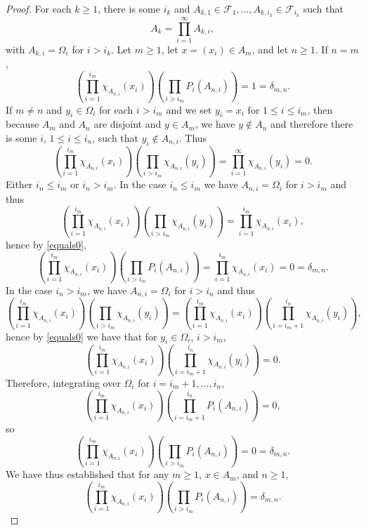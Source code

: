 \documentclass{article}
\theoremstyle{definition}
\begin{document}
\begin{proof}
For each $k \geq 1$, there is some $i_k$ and $A_{k,1} \in \mathscr{F}_1, \ldots,A_{k,i_k} \in \mathscr{F}_{i_k}$ such that
\[
A_k = \prod_{i=1}^\infty A_{k,i},
\]
with $A_{k,i}=\Omega_i$ for $i>i_k$. 
Let $m \geq 1$, let $x=(x_i) \in A_m$, and let $n \geq 1$. If $n=m$,  
\[
\left( \prod_{i=1}^{i_m} \chi_{A_{n,i}}(x_i) \right) \left( \prod_{i>i_m} P_i(A_{n,i}) \right) 
=1=\delta_{m,n}.
\]
If $m \neq n$ and $y_i \in \Omega_i$ for each $i>i_m$ and we set
$y_i=x_i$ for $1 \leq i \leq i_m$,
then  because $A_m$ and $A_n$ are disjoint and $y \in A_m$,
we have $y \not \in A_n$ and therefore there is some $i$,
$1 \leq i \leq i_n$, such that $y_i \not \in A_{n,i}$. 
Thus
\begin{equation}
\left( \prod_{i=1}^{i_m} \chi_{A_{n,i}}(x_i) \right) \left( \prod_{i>i_m} \chi_{A_{n,i}}(y_i) \right) = 
\prod_{i=1}^\infty \chi_{A_{n,i}}(y_i) = 0.
\label{equals0}
\end{equation}
Either $i_n \leq i_m$ or $i_n>i_m$. In the case $i_n \leq i_m$ we have
$A_{n,i} = \Omega_i$ for $i > i_m$ and thus
\[
\left( \prod_{i=1}^{i_m} \chi_{A_{n,i}}(x_i) \right) \left( \prod_{i>i_m} \chi_{A_{n,i}}(y_i) \right) 
= \prod_{i=1}^{i_m} \chi_{A_{n,i}}(x_i),
\]
hence by \eqref{equals0},
\[
\left( \prod_{i=1}^{i_m} \chi_{A_{n,i}}(x_i) \right)  \left( \prod_{i>i_m} P_i(A_{n,i}) \right)
=
\prod_{i=1}^{i_m} \chi_{A_{n,i}}(x_i)
 = 0 = \delta_{m,n}.
\]
In the case $i_n>i_m$, we have $A_{n,i}=\Omega_i$ for $i>i_n$ and thus
\[
\left( \prod_{i=1}^{i_m} \chi_{A_{n,i}}(x_i) \right) \left( \prod_{i>i_m} \chi_{A_{n,i}}(y_i) \right)=
\left( \prod_{i=1}^{i_m} \chi_{A_{n,i}}(x_i) \right) 
\left( \prod_{i=i_m+1}^{i_n} \chi_{A_{n,i}}(y_i) \right),
\]
hence by \eqref{equals0} we have that for $y_i \in \Omega_i$, $i > i_m$,
\[
\left( \prod_{i=1}^{i_m} \chi_{A_{n,i}}(x_i) \right) 
\left( \prod_{i=i_m+1}^{i_n} \chi_{A_{n,i}}(y_i) \right)=0.
\]
Therefore, integrating over $\Omega_i$ for $i=i_m+1,\ldots,i_n$,
\[
\left( \prod_{i=1}^{i_m} \chi_{A_{n,i}}(x_i) \right)  \left( \prod_{i=i_m+1}^{i_n} P_i(A_{n,i}) \right)
=0,
\]
so
\[
\left( \prod_{i=1}^{i_m} \chi_{A_{n,i}}(x_i) \right)  \left( \prod_{i>i_m} P_i(A_{n,i}) \right)=0=
\delta_{m,n}.
\]
We have thus established that for any $m \geq 1$, $x \in A_m$, and $n \geq 1$,
\begin{equation}
\left( \prod_{i=1}^{i_m} \chi_{A_{n,i}}(x_i) \right)  \left( \prod_{i>i_m} P_i(A_{n,i}) \right)=
\delta_{m,n}.
\label{deltamn}
\end{equation}


\end{proof}
\end{document}
